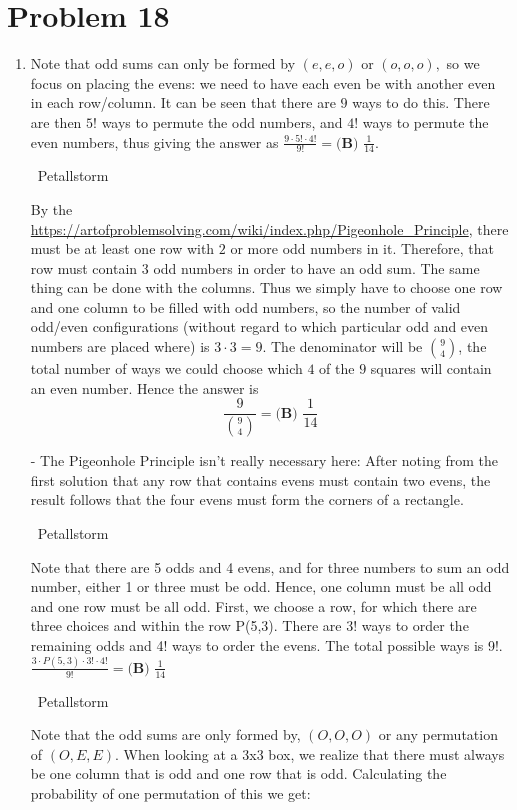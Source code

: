 \documentclass{article}%
\begin{document}
\section*{Problem 18}%
\label{sec:Problem18}%
\begin{enumerate}%
\item%
Note that odd sums can only be formed by $(e,e,o)$ or $(o,o,o),$ so we focus on placing the evens: we need to have each even be with another even in each row/column. It can be seen that there are $9$ ways to do this. There  are then $5!$ ways to permute the odd numbers, and $4!$ ways to permute the even numbers, thus giving the answer as $\frac{9 \cdot 5! \cdot 4!}{9!}=\boxed{\textbf{(B) }\frac{1}{14}}$.

~Petallstorm

By the \href{https://artofproblemsolving.com/wiki/index.php/Pigeonhole_Principle}{https://artofproblemsolving.com/wiki/index.php/Pigeonhole\_Principle}, there must be at least one row with $2$ or more odd numbers in it. Therefore, that row must contain $3$ odd numbers in order to have an odd sum. The same thing can be done with the columns. Thus we simply have to choose one row and one column to be filled with odd numbers, so the number of valid odd/even configurations (without regard to which particular odd and even  numbers are placed where) is $3 \cdot 3 = 9$. The denominator will be $\binom{9}{4}$, the total number of ways we could choose which $4$ of the $9$ squares will contain an even number. Hence the answer is \[\frac{9}{\binom{9}{4}}=\boxed{\textbf{(B) }\frac{1}{14}}\]

- The Pigeonhole Principle isn't really necessary here: After noting from the first solution that any row that contains evens must contain two evens, the result follows that the four evens must form the corners of a rectangle.

~Petallstorm

Note that there are 5 odds and 4 evens, and for three numbers to sum an odd number, either 1 or three must be odd. Hence, one column must be all odd and one row must be all odd. First, we choose a row, for which there are three choices and within the row P(5,3). There are 3! ways to order the remaining odds and 4! ways to order the evens. The total possible ways is 9!. $\frac{3 \cdot P(5,3) \cdot 3! \cdot 4!}{9!}=\boxed{\textbf{(B) }\frac{1}{14}}$

~Petallstorm

Note that the odd sums are only formed by, $(O, O, O)$ or any permutation of $(O, E, E)$. When looking at a 3x3 box, we realize that there must always be one column that is odd and one row that is odd. Calculating the probability of one permutation of this we get:


\end{enumerate}
\end{document}
